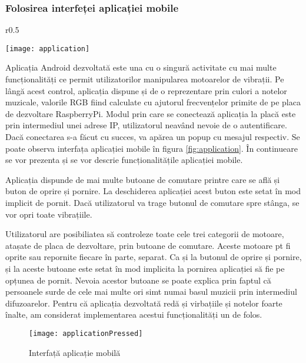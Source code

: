 \documentclass[../IoMusT.tex]{subfiles}
\begin{document}
\subsubsection{Folosirea interfeței aplicației mobile}
\begin{wrapfigure}{r}{0.5\textwidth}
\begin{center}
\texttt{[image: application]}
\caption{Interfață aplicație mobilă}
\label{fig:application}
\end{center}
\end{wrapfigure}
Aplicația Android dezvoltată este una cu o singură activitate cu mai multe funcționalități ce permit utilizatorilor manipularea motoarelor de vibrații.
 Pe lângă acest control, aplicația dispune și de o reprezentare prin culori a notelor muzicale, valorile RGB fiind calculate cu ajutorul frecvențelor primite de pe placa de dezvoltare RaspberryPi. Modul prin care se conectează aplicația la placă este prin intermediul unei adrese IP, utilizatorul neavând nevoie de o autentificare. Dacă conectarea s-a făcut cu succes, va apărea un popup cu mesajul respectiv. Se poate observa interfața aplicației mobile în figura \ref{fig:application}. În continueare se vor prezenta și se vor descrie funcționalitățile aplicației mobile.
\\
\par Aplicația dispunde de mai multe butoane de comutare printre care se află și buton de oprire și pornire. La deschiderea aplicației acest buton este setat în mod implicit de pornit. Dacă utilizatorul va trage butonul de comutare spre stânga, se vor opri toate vibrațiile.
\\
\par Utilizatorul are posibiliatea să controleze toate cele trei categorii de motoare, atașate de placa de dezvoltare, prin butoane de comutare. Aceste motoare pt fi oprite sau repornite fiecare în parte, separat. Ca și la butonul de oprire și pornire, și la aceste butoane este setat în mod implicita la pornirea aplicației să fie pe opțunea de pornit. Nevoia acestor butoane se poate explica prin faptul că persoanele surde de cele mai multe ori simt numai basul muzicii prin intermediul difuzoarelor. Pentru că aplicația dezvoltată redă și virbațiile și notelor foarte înalte, am considerat implementarea acestui funcționalități un de folos. 
\begin{figure}[h]
\begin{center}
\texttt{[image: applicationPressed]}
\caption{Interfață aplicație mobilă}
\label{fig:applicationPressed}
\end{center}
\end{figure}
\end{document}
